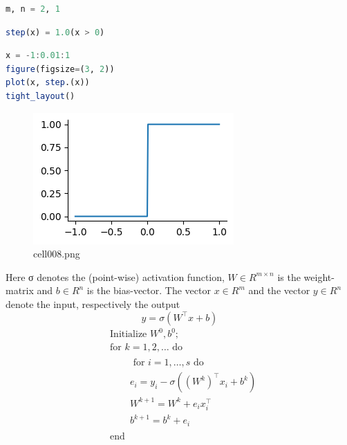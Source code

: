\begin{lstlisting}[language=julia]
m, n = 2, 1
\end{lstlisting}
\begin{lstlisting}[language=julia]
step(x) = 1.0(x > 0)
\end{lstlisting}
\begin{lstlisting}[language=julia]
x = -1:0.01:1
figure(figsize=(3, 2))
plot(x, step.(x))
tight_layout()
\end{lstlisting}
\begin{figure}[ht]
	\centering
	\includegraphics[scale=0.8, max width=\linewidth]{./fig/local-learning-rule/logistic-regression-perceptron/cell008.png}
	\caption{cell008.png}
	\label{cell008.png}
\end{figure}
Here σ denotes the (point-wise) activation function, $W \in R^{m\times n}$
is the weight-matrix and $b \in R^n$
is
the bias-vector. The vector $x \in R^m$ and the vector $y \in R^n$ denote the input, respectively the output
\begin{equation}
y=\sigma(W^\top x + b)
\end{equation}
\begin{align}
& \text { Initialize } W^0, b^0 \text {; } \\
& \text { for } k=1,2, \ldots \text { do } \\
& \qquad \begin{array}{|l}
\text { for } i=1, \ldots, s \text { do } \\
e_i=y_i-\sigma\left(\left(W^k\right)^{\top} x_i+b^k\right) \\
W^{k+1}=W^k+e_i x_i^{\top} \\
b^{k+1}=b^k+e_i
\end{array} \\
& \text { end }
\end{align}
